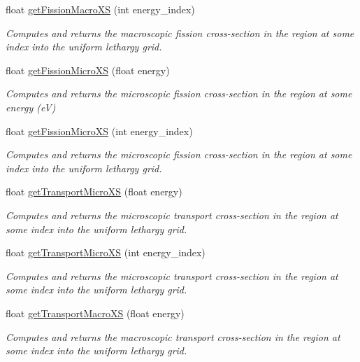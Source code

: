 \begin{DoxyCompactItemize}
float \hyperlink{classRegion_a92df554bce8ad1fc5779d4b4f0d1329a}{get\-Fission\-Macro\-X\-S} (int energy\-\_\-index)
\begin{DoxyCompactList}\small\item\em Computes and returns the macroscopic fission cross-\/section in the region at some index into the uniform lethargy grid. \end{DoxyCompactList}\item 
float \hyperlink{classRegion_ac752b2a3eef8f5d5a1003f5f5b6bdf89}{get\-Fission\-Micro\-X\-S} (float energy)
\begin{DoxyCompactList}\small\item\em Computes and returns the microscopic fission cross-\/section in the region at some energy (e\-V) \end{DoxyCompactList}\item 
float \hyperlink{classRegion_a93a93182c14494e09a35bfda54a0cebd}{get\-Fission\-Micro\-X\-S} (int energy\-\_\-index)
\begin{DoxyCompactList}\small\item\em Computes and returns the microscopic fission cross-\/section in the region at some index into the uniform lethargy grid. \end{DoxyCompactList}\item 
float \hyperlink{classRegion_a5945faaec979b87aaf2b673ac240cc7d}{get\-Transport\-Micro\-X\-S} (float energy)
\begin{DoxyCompactList}\small\item\em Computes and returns the microscopic transport cross-\/section in the region at some index into the uniform lethargy grid. \end{DoxyCompactList}\item 
float \hyperlink{classRegion_abd82a6bf83979583bfbf15b47e4e9a25}{get\-Transport\-Micro\-X\-S} (int energy\-\_\-index)
\begin{DoxyCompactList}\small\item\em Computes and returns the microscopic transport cross-\/section in the region at some index into the uniform lethargy grid. \end{DoxyCompactList}\item 
float \hyperlink{classRegion_a7f26efd91c1fd8ab53c14f48db5ba236}{get\-Transport\-Macro\-X\-S} (float energy)
\begin{DoxyCompactList}\small\item\em Computes and returns the macroscopic transport cross-\/section in the region at some index into the uniform lethargy grid. \end{DoxyCompactList}\item 

\end{DoxyCompactItemize}

